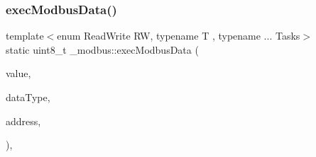 \hypertarget{namespace__modbus_a0e0c328bb7fcf1f7e252b22c753219dd}{}\label{namespace__modbus_a0e0c328bb7fcf1f7e252b22c753219dd} 
\subsubsection{\texorpdfstring{exec\+Modbus\+Data()}{execModbusData()}\hspace{0.1cm}{\footnotesize\ttfamily [3/3]}}
{\footnotesize\ttfamily template$<$enum Read\+Write RW, typename T , typename ... Tasks$>$ \\
static uint8\+\_\+t \+\_\+modbus\+::exec\+Modbus\+Data (\begin{DoxyParamCaption}\item[{uint16\+\_\+t \&}]{value,  }\item[{const enum \hyperlink{namespace__modbus_a85902c8bc1ff424855dad072259df913}{Data\+Type} \&}]{data\+Type,  }\item[{const uint16\+\_\+t \&}]{address,  }\item[{\+\_\+task\+\_\+list\+::\+Task\+List$<$ T, Tasks... $>$}]{ }\end{DoxyParamCaption})\hspace{0.3cm}{\ttfamily [inline]}, {\ttfamily [static]}}


